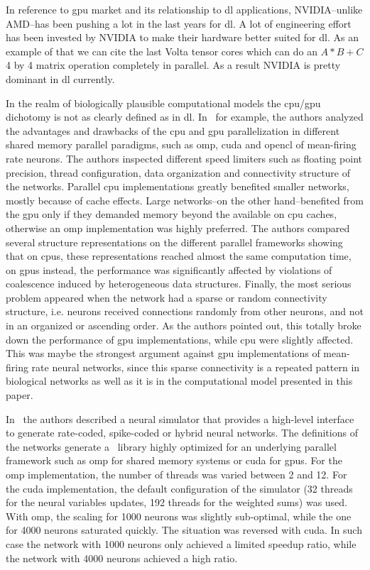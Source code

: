 {In reference to \gls{gpu} market and its relationship to \gls{dl} applications, NVIDIA--unlike AMD--has been pushing a lot in the last years for \gls{dl}. A lot of engineering effort has been invested by NVIDIA to make their hardware better suited for \gls{dl}. As an example of that we can cite the last Volta tensor cores which can do an $A*B+C$ 4 by 4 matrix operation completely in parallel. As a result NVIDIA is pretty dominant in \gls{dl} currently.

In the realm of biologically plausible computational models the \gls{cpu}/\gls{gpu} dichotomy is not as clearly defined as in \gls{dl}. In~\cite{doi:10.3109/0954898X.2012.739292} for example, the authors analyzed the advantages and drawbacks of the \gls{cpu} and \gls{gpu} parallelization in different shared memory parallel paradigms, such as \gls{omp}, \gls{cuda} and \gls{opencl} of mean-firing rate neurons. The authors inspected different speed limiters such as floating point precision, thread configuration, data organization and connectivity structure of the networks. Parallel \gls{cpu} implementations greatly benefited smaller networks, mostly because of cache effects. Large networks--on the other hand--benefited from the \gls{gpu} only if they demanded memory beyond the available on \gls{cpu} caches, otherwise an \gls{omp} implementation was highly preferred. The authors compared several structure representations on the different parallel frameworks showing that on \glspl{cpu}, these representations reached almost the same computation time, on \glspl{gpu} instead, the performance was significantly affected by violations of coalescence induced by heterogeneous data structures. Finally, the most serious problem appeared when the network had a sparse or random connectivity structure, i.e. neurons received connections randomly from other neurons, and not in an organized or ascending order. As the authors pointed out, this totally broke down the performance of \gls{gpu} implementations, while \gls{cpu} were slightly affected. This was maybe the strongest argument against \gls{gpu} implementations of mean-firing rate neural networks, since this sparse connectivity is a repeated pattern in biological networks as well as it is in the computational model presented in this paper.

In~\cite{10.3389/fninf.2015.00019} the authors described a neural simulator that provides a high-level interface to generate rate-coded, spike-coded or hybrid neural networks. The definitions of the networks generate a \CC~library highly optimized for an underlying parallel framework such as \gls{omp} for shared memory systems or \gls{cuda} for \glspl{gpu}. For the \gls{omp} implementation, the number of threads was varied between 2 and 12. For the \gls{cuda} implementation, the default configuration of the simulator (32 threads for the neural variables updates, 192 threads for the weighted sums) was used. With \gls{omp}, the scaling for 1000 neurons was slightly sub-optimal, while the one for 4000 neurons saturated quickly. The situation was reversed with \gls{cuda}. In such case the network with 1000 neurons only achieved a limited speedup ratio, while the network with 4000 neurons achieved a high ratio.

}
